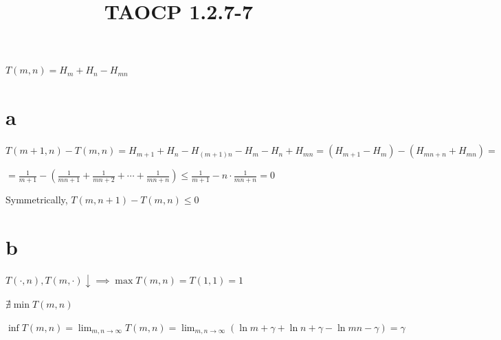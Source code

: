 \documentclass{article}
\title{TAOCP 1.2.7\mbox{-}7}
\begin{document}
\maketitle

\( T(m, n) = H_{m} + H_{n} - H_{mn} \)

\section*{a}

\( T(m+1,n) - T(m,n) = H_{m+1} + H_{n} - H_{(m+1)n} - H_{m} - H_{n} + H_{mn} = (H_{m+1} - H_{m}) - (H_{mn+n} + H_{mn}) = \)

\( = \frac{1}{m+1} - (\frac{1}{mn+1} + \frac{1}{mn+2} + \cdots + \frac{1}{mn+n}) \leq \frac{1}{m+1} - n \cdot \frac{1}{mn+n} = 0 \)

Symmetrically, \( T(m, n + 1) - T(m,n) \leq 0 \)

\section*{b}

\( T(\cdot, n), T(m, \cdot) \downarrow \implies \max T(m,n) = T(1,1) = 1 \)

\( \nexists \min T(m,n) \)

\( \inf T(m,n) = \lim_{m,n \to \infty} T(m,n) = \lim_{m,n \to \infty} (\ln m + \gamma + \ln{n} + \gamma - \ln{mn} -\gamma) = \gamma \)
\end{document}
